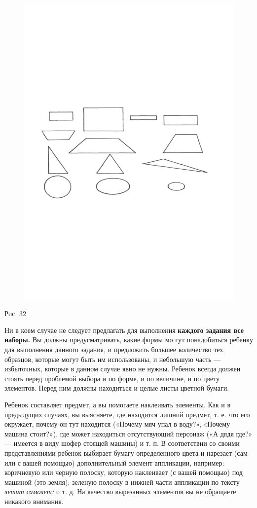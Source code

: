\documentclass[a5paper]{book}
\renewcommand{\emph}[1]{\textit{#1}}
\begin{document}
\begin{figure}
\centering
\includegraphics[width=\linewidth]{media/media/image29.png}
\end{figure}

Рис. 32

Ни в коем случае не следует предлагать для выполнения \textbf{каждого
задания все наборы.} Вы должны предусматривать, какие формы мо гут
понадобиться ребенку для выполнения данного задания, и предложить
большее количество тех образцов, которые могут быть им использованы, и
небольшую часть --- избыточных, которые в данном случае явно не нужны.
Ребенок всегда должен стоять перед проблемой выбора и по форме, и по
величине, и по цвету элементов. Перед ним должны находиться и целые
листы цветной бумаги.

Ребенок составляет предмет, а вы помогаете наклеивать элементы. Как и в
предыдущих случаях, вы выясняете, где находится лишний предмет, т. е.
что его окружает, почему он тут находится («Почему мяч упал в воду?»,
«Почему машина стоит?»), где может находиться отсутствующий персонаж («А
дядя где?» --- имеется в виду шофер стоящей машины) и т. п. В
соответствии со своими представлениями ребенок выбирает бумагу
определенного цвета и нарезает (сам или с вашей помощью) дополнительный
элемент аппликации, например: коричневую или черную полоску, которую
наклеивает (с вашей помощью) под машиной (это земля); зеленую полоску в
нижней части аппликации по тексту \emph{летит самолет:} и т. д. На
качество вырезанных элементов вы не обращаете никакого внимания.
\end{document}
